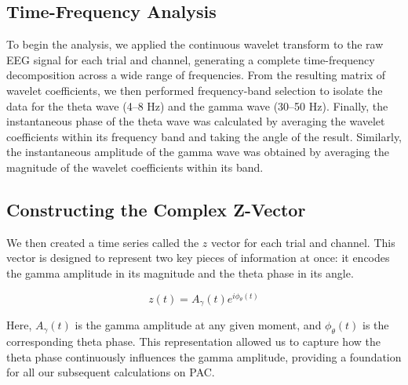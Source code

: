 \documentclass[hidelinks,12pt]{article}
\begin{document}
	\subsection{Time-Frequency Analysis}
	
	To begin the analysis, we applied the continuous wavelet transform to the raw EEG signal for each trial and channel, generating a complete time-frequency decomposition across a wide range of frequencies. From the resulting matrix of wavelet coefficients, we then performed frequency-band selection to isolate the data for the theta wave (4--8 Hz) and the gamma wave (30--50 Hz). Finally, the instantaneous phase of the theta wave was calculated by averaging the wavelet coefficients within its frequency band and taking the angle of the result. Similarly, the instantaneous amplitude of the gamma wave was obtained by averaging the magnitude of the wavelet coefficients within its band.
	
	\subsection{Constructing the Complex Z-Vector}
	
	We then created a time series called the $z$ vector for each trial and channel. This vector is designed to represent two key pieces of information at once: it encodes the gamma amplitude in its magnitude and the theta phase in its angle.
	
	\[
	z(t) = A_\gamma(t) e^{i \phi_\theta(t)}
	\]
	
	Here, $A_\gamma(t)$ is the gamma amplitude at any given moment, and $\phi_\theta(t)$ is the corresponding theta phase. This representation allowed us to capture how the theta phase continuously influences the gamma amplitude, providing a foundation for all our subsequent calculations on PAC.
	
\end{document}
